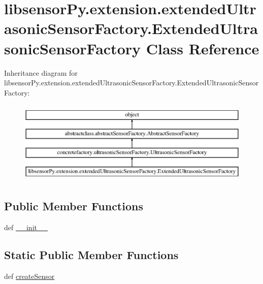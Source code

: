 \hypertarget{classlibsensorPy_1_1extension_1_1extendedUltrasonicSensorFactory_1_1ExtendedUltrasonicSensorFactory}{}\section{libsensor\+Py.\+extension.\+extended\+Ultrasonic\+Sensor\+Factory.\+Extended\+Ultrasonic\+Sensor\+Factory Class Reference}
\label{classlibsensorPy_1_1extension_1_1extendedUltrasonicSensorFactory_1_1ExtendedUltrasonicSensorFactory}
Inheritance diagram for libsensor\+Py.\+extension.\+extended\+Ultrasonic\+Sensor\+Factory.\+Extended\+Ultrasonic\+Sensor\+Factory\+:\begin{figure}[H]
\begin{center}
\leavevmode
\includegraphics[height=4.000000cm]{classlibsensorPy_1_1extension_1_1extendedUltrasonicSensorFactory_1_1ExtendedUltrasonicSensorFactory}
\end{center}
\end{figure}
\subsection*{Public Member Functions}
\begin{DoxyCompactItemize}
\item 
def \hyperlink{classlibsensorPy_1_1extension_1_1extendedUltrasonicSensorFactory_1_1ExtendedUltrasonicSensorFactory_aee938dff317a26ffb19473b1db293090}{\+\_\+\+\_\+init\+\_\+\+\_\+}
\end{DoxyCompactItemize}
\subsection*{Static Public Member Functions}
\begin{DoxyCompactItemize}
\item 
def \hyperlink{classlibsensorPy_1_1extension_1_1extendedUltrasonicSensorFactory_1_1ExtendedUltrasonicSensorFactory_a8cd799c235b69924d65802d336989543}{create\+Sensor}
\end{DoxyCompactItemize}


